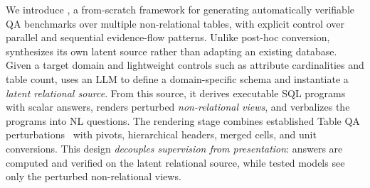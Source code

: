 We introduce \name, a from-scratch framework for generating automatically verifiable QA benchmarks over multiple non-relational tables, with explicit control over parallel and sequential evidence-flow patterns. Unlike post-hoc conversion, \name synthesizes its own latent source rather than adapting an existing database. Given a target domain and lightweight controls such as attribute cardinalities and table count, \name uses an LLM to define a domain-specific schema and instantiate a \emph{latent relational source}. From this source, it derives executable SQL programs with scalar answers, renders perturbed \emph{non-relational views}, and verbalizes the programs into NL questions. The rendering stage combines established Table QA perturbations~\cite{2.4,2.5,2.6,2.8} with pivots, hierarchical headers, merged cells, and unit conversions. This design \emph{decouples supervision from presentation}: answers are computed and verified on the latent relational source, while tested models see only the perturbed non-relational views.
